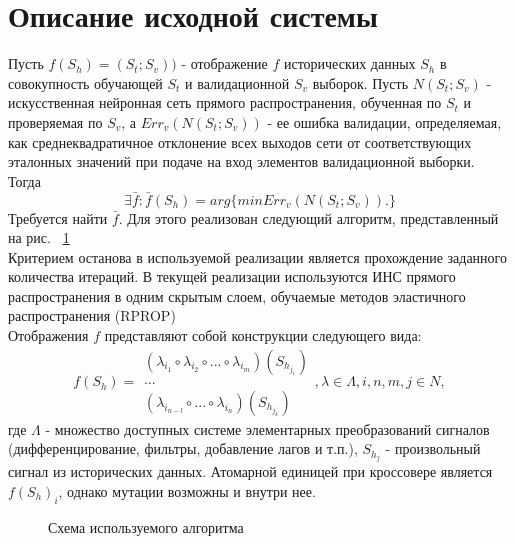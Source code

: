 \documentclass[utf8,usehyperref,12pt]{G7-32}
\begin{document}
\section{Описание исходной системы}
Пусть $ f(S_{h})=(S_{t}; S_{v})) $ - отображение $f$ исторических данных $S_{h}$ в совокупность обучающей $S_{t}$ и валидационной $S_{v}$ выборок. Пусть $ N(S_{t}; S_{v}) $ - искусственная нейронная сеть прямого распространения, обученная по $S_{t}$ и проверяемая по $S_{v}$, а $ Err_{v}(N(S_{t}; S_{v})) $ - ее ошибка валидации, определяемая, как среднеквадратичное отклонение всех выходов сети от соответствующих эталонных значений при подаче на вход элементов валидационной выборки. Тогда
\begin{equation}
\exists\bar{f}:\bar{f}(S_{h})=arg\{min Err_{v}(N(S_{t}; S_{v})). \}
\end{equation}
Требуется найти $ \bar{f} $. Для этого реализован следующий алгоритм, представленный на рис. ~\ref{algo} \\
Критерием останова в используемой реализации является прохождение заданного количества итераций. В текущей реализации используются ИНС прямого распространения в одним скрытым слоем, обучаемые методов эластичного распространения (RPROP)\\
Отображения $f$ представляют собой конструкции следующего вида:
\begin{equation}
f(S_{h})=\begin{array}{|c|}
(\lambda_{i_{1}} \circ \lambda_{i_{2}} \circ ... \circ \lambda_{i_{m}})(S_{h_{j_{1}}}) \\
...\\
(\lambda_{i_{n-l}} \circ ... \circ \lambda_{i_{n}})(S_{h_{j_{k}}})
\end{array}
, \lambda\in\Lambda, i,n,m,j\in N,
\end{equation}
где $\Lambda$ - множество доступных системе элементарных преобразований сигналов (дифференцирование, фильтры, добавление лагов и т.п.), $S_{h_{j}}$ - произвольный сигнал из исторических данных. Атомарной единицей при кроссовере является $f(S_{h})_{i}$, однако мутации возможны и внутри нее.\\
\begin{figure}[H]
 \caption{Схема используемого алгоритма}\label{algo}
\end{figure}
\end{document}
